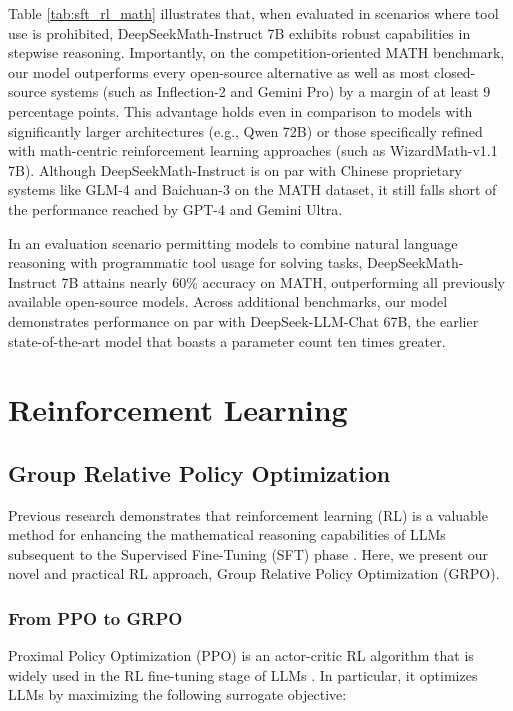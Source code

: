 \begin{itemize}[topsep=0pt]
\begin{itemize}[topsep=0pt]
Table \ref{tab:sft_rl_math} illustrates that, when evaluated in scenarios where tool use is prohibited, DeepSeekMath-Instruct 7B exhibits robust capabilities in stepwise reasoning. Importantly, on the competition-oriented MATH benchmark, our model outperforms every open-source alternative as well as most closed-source systems (such as Inflection-2 and Gemini Pro) by a margin of at least 9 percentage points. This advantage holds even in comparison to models with significantly larger architectures (e.g., Qwen 72B) or those specifically refined with math-centric reinforcement learning approaches (such as WizardMath-v1.1 7B). Although DeepSeekMath-Instruct is on par with Chinese proprietary systems like GLM-4 and Baichuan-3 on the MATH dataset, it still falls short of the performance reached by GPT-4 and Gemini Ultra.

In an evaluation scenario permitting models to combine natural language reasoning with programmatic tool usage for solving tasks, DeepSeekMath-Instruct 7B attains nearly 60\% accuracy on MATH, outperforming all previously available open-source models. Across additional benchmarks, our model demonstrates performance on par with DeepSeek-LLM-Chat 67B, the earlier state-of-the-art model that boasts a parameter count ten times greater.  
\section{Reinforcement Learning}

\subsection{Group Relative Policy Optimization} Previous research demonstrates that reinforcement learning (RL) is a valuable method for enhancing the mathematical reasoning capabilities of LLMs subsequent to the Supervised Fine-Tuning (SFT) phase \citep{wang2023math,wizardmath}. Here, we present our novel and practical RL approach, Group Relative Policy Optimization (GRPO).

\subsubsection{From PPO to GRPO} Proximal Policy Optimization (PPO) \citep{schulman2017proximal} is an actor-critic RL algorithm that is widely used in the RL fine-tuning stage of LLMs \citep{ouyang2022training}. In particular, it optimizes LLMs by maximizing the following surrogate objective:


\end{itemize}
\end{itemize}
